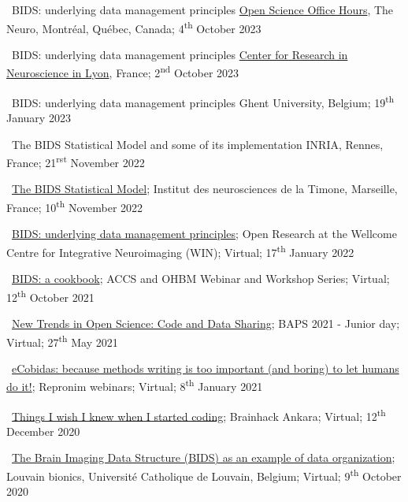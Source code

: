\textbullet~BIDS: underlying data management principles
\href{https://openscienceofficehours.github.io/osoh_website/}{Open Science Office Hours}, The Neuro, Montréal, Québec, Canada;
4\textsuperscript{th} October 2023

\textbullet~BIDS: underlying data management principles
\href{https://www.crnl.fr/en}{Center for Research in Neuroscience in Lyon}, France;
2\textsuperscript{nd} October 2023

\textbullet~BIDS: underlying data management principles
Ghent University, Belgium;
19\textsuperscript{th} January 2023

\textbullet~The BIDS Statistical Model and some of its implementation
INRIA, Rennes, France;
21\textsuperscript{rst} November 2022

\textbullet~\href{https://osf.io/jpfrh}
{The BIDS Statistical Model};
Institut des neurosciences de la Timone, Marseille, France;
10\textsuperscript{th} November 2022

\textbullet~\href{https://osf.io/h6gsr/}{BIDS: underlying data management principles};
Open Research at the Wellcome Centre for Integrative Neuroimaging (WIN);
Virtual;
17\textsuperscript{th} January 2022

\textbullet~\href{https://remi-gau.github.io/bids_cookbook/}{BIDS: a cookbook};
ACCS and OHBM Webinar and Workshop Series;
Virtual;
12\textsuperscript{th} October 2021

\textbullet~\href{https://osf.io/6kzn2/}{New Trends in Open Science: Code and Data Sharing};
BAPS 2021 - Junior day;
Virtual;
27\textsuperscript{th} May 2021

\textbullet~\href{https://osf.io/fb7tx/}{eCobidas: because methods writing is too important (and boring) to let humans do it!};
Repronim webinars;
Virtual;
8\textsuperscript{th} January 2021

\textbullet~\href{https://osf.io/vdgua/}{Things I wish I knew when I started coding};
Brainhack Ankara;
Virtual;
12\textsuperscript{th} December 2020

\textbullet~\href{https://osf.io/zf5x8/}{The Brain Imaging Data Structure (BIDS) as an example of data organization};
Louvain bionics, Université Catholique de Louvain, Belgium;
Virtual;
9\textsuperscript{th} October 2020

